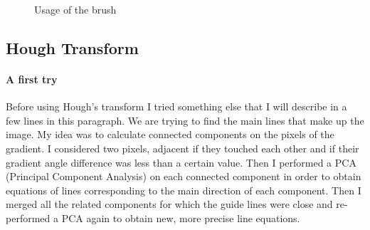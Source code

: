 \documentclass[11pt]{article}
\begin{document}
\begin{figure}[h]
		\vspace{-2mm}
		\caption{Usage of the brush}
		\label{im:brush}
	\end{figure}
	
	\subsection{Hough Transform}
	
	\paragraph{A first try}
	Before using Hough's transform I tried something else that I will describe in a few lines in this paragraph. We are trying to find the main lines that make up the image. My idea was to calculate connected components on the pixels of the gradient. I considered two pixels, adjacent if they touched each other and if their gradient angle difference was less than a certain value. Then I performed a PCA (Principal Component Analysis) \cite{pca} on each connected component in order to obtain equations of lines corresponding to the main direction of each component. Then I merged all the related components for which the guide lines were close and re-performed a PCA again to obtain new, more precise line equations.
	
\end{document}
